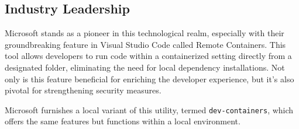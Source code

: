 \documentclass[10pt,journal,compsoc]{IEEEtran}
\begin{document}
\subsection{Industry Leadership}

Microsoft stands as a pioneer in this technological realm, especially with their groundbreaking feature in Visual Studio Code called Remote Containers. This tool allows developers to run code within a containerized setting directly from a designated folder, eliminating the need for local dependency installations. Not only is this feature beneficial for enriching the developer experience, but it's also pivotal for strengthening security measures.

Microsoft furnishes a local variant of this utility, termed \verb|dev-containers|, which offers the same features but functions within a local environment.

\end{document}
